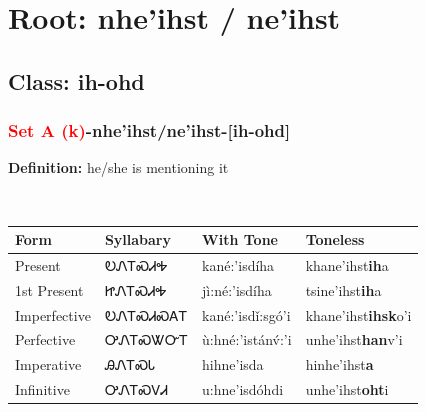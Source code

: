 \needspace{4in}
\section*{Root: nhe'ihst / ne'ihst}
\nopagebreak
{}
\needspace{3in}
\subsection*{Class: ih-ohd}
\nopagebreak
\needspace{2in}
\subsubsection*{\textcolor{Red}{Set A (k)}{-}\textbf{nhe'ihst/ne'ihst}{-}[ih-ohd]}
\nopagebreak
\textbf{Definition: } he/she is mentioning it
\\[0.5em]
\begin{tabularx}{\textwidth}{l X X X}%
\toprule%
\textbf{Form}&\textbf{Syllabary}&\textbf{With Tone}&\textbf{Toneless}\\%
\midrule%
Present&ᎧᏁᎢᏍᏗᎭ&kané:’isdíha&khane'ihst\textbf{ih}a\\%
1st Present&ᏥᏁᎢᏍᏗᎭ&jì:né:’isdíha&tsine'ihst\textbf{ih}a\\%
Imperfective&ᎧᏁᎢᏍᏗᏍᎪᎢ&kané:’isdǐ:sgó’i&khane'ihst\textbf{ihsk}o'i\\%
Perfective&ᎤᏁᎢᏍᏔᏅᎢ&ù:hné:’istánv́:’i&unhe'ihst\textbf{han}v'i\\%
Imperative&ᎯᏁᎢᏍᏓ&hihne’isda&hinhe'ihst\textbf{a}\\%
Infinitive&ᎤᏁᎢᏍᏙᏗ&u:hne’isdóhdi&unhe'ihst\textbf{oht}i\\%
\bottomrule%
\end{tabularx}
\\[1em]